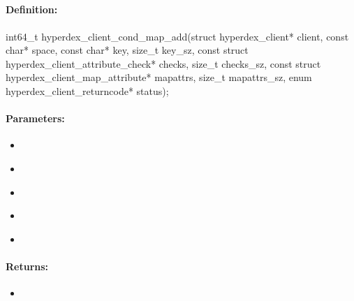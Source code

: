 \pagebreak
\subsection{}
\label{api:c:cond_map_add}


\paragraph{Definition:}
\begin{ccode}
int64_t hyperdex_client_cond_map_add(struct hyperdex_client* client,
        const char* space,
        const char* key, size_t key_sz,
        const struct hyperdex_client_attribute_check* checks, size_t checks_sz,
        const struct hyperdex_client_map_attribute* mapattrs, size_t mapattrs_sz,
        enum hyperdex_client_returncode* status);
\end{ccode}

\paragraph{Parameters:}
\begin{itemize}[noitemsep]
\item {}\\

\item {}\\

\item {}\\

\item {}\\

\item {}\\

\end{itemize}

\paragraph{Returns:}
\begin{itemize}[noitemsep]
\item {}\\

\end{itemize}

